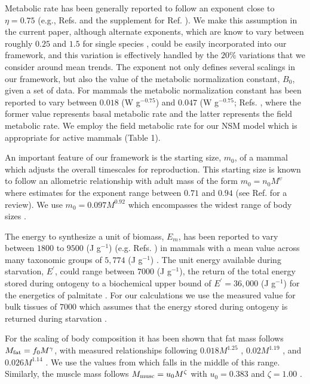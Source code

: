 \documentclass[twocolumn,preprintnumbers,amsmath,amssymb,superscriptaddress]{revtex4}
\begin{document}
\begin{bibunit}[unsrt]
Metabolic rate has been generally reported to follow an exponent close to $\eta=0.75$ (e.g., Refs. \cite{West:2001bv,moses2008rmo} and the supplement for Ref. \cite{hou}). We make this assumption in the current paper, although alternate exponents, which are know to vary between roughly $0.25$ and $1.5$ for single species \cite{moses2008rmo}, could be easily incorporated into our framework, and this variation is effectively handled by the $20\%$ variations that we consider around mean trends. The exponent not only defines several scalings in our framework, but also the value of the metabolic normalization constant, $B_{0}$, given a set of data.  For mammals the metabolic normalization constant has been reported to vary between $0.018$ (W g$^{-0.75}$) and $0.047$ (W g$^{-0.75}$; Refs. \cite{hou,West:2001bv}, where the former value represents basal metabolic rate and the latter represents the field metabolic rate. We employ the field metabolic rate for our NSM model which is appropriate for active mammals (Table 1).

An important feature of our framework is the starting size, $m_{0}$, of a mammal which adjusts the overall timescales for reproduction. This starting size is known to follow an allometric relationship with adult mass of the form $m_{0}=n_{0}M^{\upsilon}$ where estimates for the exponent range between $0.71$ and $0.94$ (see Ref. \cite{peters1986ecological} for a review). We use $m_{0}=0.097M^{0.92}$ \cite{blueweiss1978relationships} which encompasses the widest range of body sizes \cite{peters1986ecological}.

The energy to synthesize a unit of biomass, $E_{m}$, has been reported to vary between $1800$ to $9500$ (J g$^{-1}$) (e.g. Refs. \cite{West:2001bv,moses2008rmo,hou}) in mammals with a mean value across many taxonomic groups of $5,774$ (J g$^{-1}$) \cite{moses2008rmo}. The unit energy available during starvation, $E^{\prime}$, could range between $7000$ (J g$^{-1}$), the return of the total energy stored during ontogeny \cite{hou} to a biochemical upper bound of $E^{\prime}=36,000$ (J g$^{-1}$) for the energetics of palmitate \cite{stryer,hou}. For our calculations we use the measured value for bulk tissues of $7000$ which assumes that the energy stored during ontogeny is returned during starvation \cite{hou}.

For the scaling of body composition it has been shown that fat mass follows $M_{\rm fat}=f_{0}M^{\gamma}$, with measured  relationships following  $0.018M^{1.25}$ \cite{Dunbrack:1993ec}, $0.02M^{1.19}$ \cite{Lindstedt:1985hm}, and $0.026M^{1.14}$ \cite{Lindstedt:2002td}. We use the values from \cite{Lindstedt:1985hm} which falls in the middle of this range. Similarly, the muscle mass follows $M_{\rm musc}=u_{0}M^{\zeta}$ with $u_{0}=0.383$ and $\zeta=1.00$ \cite{Lindstedt:2002td}.


\end{bibunit}
\end{document}
